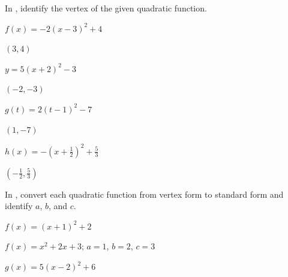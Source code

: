 
In , identify the vertex of the given quadratic function.


\begin{exercise}\label{exercise-3.3.1}
$f(x)=-2(x-3)^2+4$
\end{exercise}

\begin{solution}
    $(3,4)$
\end{solution}



\begin{exercise}
$y=5(x+2)^2-3$
\end{exercise}

\begin{solution}
    $(-2,-3)$
\end{solution}



\begin{exercise}
$g(t)=2(t-1)^2-7$
\end{exercise}

\begin{solution}
    $(1,-7)$
\end{solution}



\begin{exercise}\label{exercise-3.3.4}
$h(x)=-(x+\frac{1}{2})^2+\frac{5}{3}$
\end{exercise}

\begin{solution}
    $\left(-\frac{1}{2},\frac{5}{3}\right)$
\end{solution}







\noindent In , convert each quadratic function from vertex form to standard form and identify $a$, $b$, and $c$.


\begin{exercise}\label{exercise-3.3.5}
$f(x)=(x+1)^2+2$
\end{exercise}

\begin{solution}
    $f(x)=x^2+2x+3$; $a=1$, $b=2$, $c=3$
\end{solution}



\begin{exercise}
$g(x)=5(x-2)^2+6$
\end{exercise}

